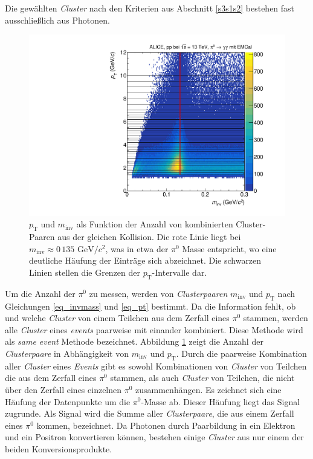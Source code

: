 Die gewählten \textit{Cluster} nach den Kriterien aus Abschnitt \ref{s3s1s2} bestehen fast ausschließlich aus Photonen.
\begin{figure}[t!]
\centering
\includegraphics[width=.7\linewidth]{hInvMass_pT_Signal.pdf}
\caption{$p_\text{T}$ und $m_\text{inv}$ als Funktion der Anzahl von kombinierten  Cluster-Paaren aus der gleichen Kollision.
Die rote Linie liegt bei $m_{\text{inv}}\approx0\,135\text{ GeV/}c^{2}$, was in etwa der $\pi^{0}$ Masse entspricht, wo eine deutliche Häufung der Einträge sich abzeichnet.
Die schwarzen Linien stellen die Grenzen der $p_{\text{T}}$-Intervalle dar.}
\label{figInvMassPt_a}
\end{figure}
\newline
Um die Anzahl der $\pi^{0}$ zu messen, werden von \textit{Clusterpaaren} $m_\text{inv}$ und $p_\text{T}$ nach Gleichungen \ref{eq_invmass} und \ref{eq_pt} bestimmt.
Da die Information fehlt, ob und welche \textit{Cluster} von einem Teilchen aus dem Zerfall eines $\pi^{0}$ stammen, werden alle \textit{Cluster} eines \textit{events} paarweise mit einander kombiniert.
Diese Methode wird als \textit{same event} Methode bezeichnet.
Abbildung \ref{figInvMassPt_a} zeigt die Anzahl der \textit{Clusterpaare} in Abhängigkeit von $m_{\text{inv}}$ und $p_{\text{T}}$.
Durch die paarweise Kombination aller \textit{Cluster} eines \textit{Events} gibt es sowohl Kombinationen von \textit{Cluster} von Teilchen die aus dem Zerfall eines $\pi^{0}$ stammen, als auch \textit{Cluster} von Teilchen, die nicht über den Zerfall eines einzelnen $\pi^{0}$ zusammenhängen.
\newline
Es zeichnet sich eine Häufung der Datenpunkte um die $\pi^{0}$-Masse ab.
Dieser Häufung liegt das Signal zugrunde.
Als Signal wird die Summe aller \textit{Clusterpaare}, die aus einem Zerfall eines $\pi^{0}$ kommen, bezeichnet.
Da Photonen durch Paarbildung in ein Elektron und ein Positron konvertieren können, bestehen einige \textit{Cluster} aus nur einem der beiden Konversionsprodukte.
